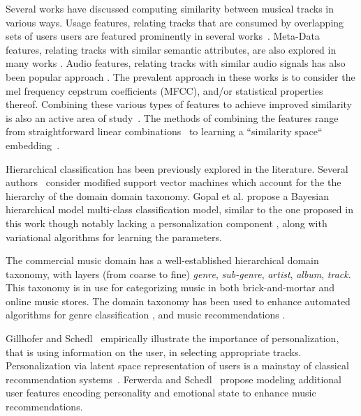 Several works have discussed computing similarity between musical tracks in various ways. Usage features, relating tracks that are consumed by overlapping sets of users users are featured prominently in several works~\cite{item2vec,Mcfee_learningsimilarity_CF,Dror2011}. Meta-Data features, relating tracks with similar semantic attributes, are also explored in many works \cite{Bogdanov_content,  McfeeEtAl_2009_HeteEmbeForSubj, Pauws:ISMIR02,SlaneyEtAl_2008_LearAMetrFor}. Audio features, relating tracks with similar audio signals has also been popular approach \cite{DoplerEtAl_2008_AcceMusiCollVia, Lee2011,a2mf}. The prevalent approach in these works is to 
consider the mel frequency cepstrum coefficients (MFCC), and/or statistical properties thereof.
Combining these various types of features to achieve improved similarity is also an active area of study~\cite{Knees:2006, Mcfee_learningsimilarity_CF,McFee_multi_similarities,Schedl:2015}. The methods of combining the features range from straightforward linear combinations~\cite{Knees:2006} to learning a ``similarity space`` embedding~\cite{McFee_multi_similarities}.


Hierarchical classification has been previously explored in the literature.   Several authors~\cite{Cai2004,Zhou2011} consider modified support vector machines which account for the the hierarchy of the domain domain taxonomy. Gopal et al. \cite{NIPS2012_4609} propose a Bayesian hierarchical model multi-class classification model, similar to the one proposed in this work though notably lacking a personalization component , along with variational algorithms for learning the parameters. 

The commercial music domain has a well-established hierarchical domain taxonomy, with  layers (from coarse to fine) \textit{genre}, \textit{sub-genre}, \textit{artist}, \textit{album}, \textit{track}. This taxonomy is in use for categorizing music in both brick-and-mortar and online music stores. The domain taxonomy has been used to enhance automated algorithms for genre classification \cite{DecoroEtAl_2007_BayeAggrForHier}, and music recommendations \cite{Dror2011,Mnih2012}.



Gillhofer and Schedl~\cite{Gillhofer2015} empirically illustrate the importance of personalization, that is using information on the user, in selecting appropriate tracks. Personalization via latent space representation of users is a mainstay of classical recommendation systems~\cite{KorenBV09}. Ferwerda and Schedl~\cite{personalized_playlist_schedl} propose modeling additional user features encoding personality and emotional state to enhance music recommendations.

